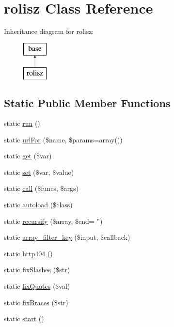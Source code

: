 \hypertarget{classrolisz}{
\section{rolisz Class Reference}
\label{classrolisz}
}
Inheritance diagram for rolisz:\begin{figure}[H]
\begin{center}
\leavevmode
\includegraphics[height=2.000000cm]{classrolisz}
\end{center}
\end{figure}
\subsection*{Static Public Member Functions}
\begin{DoxyCompactItemize}
\item 
static \hyperlink{classrolisz_ad3a572002fd350672b531756f7306e8f}{run} ()
\item 
static \hyperlink{classrolisz_a2c24b81993e81c6401edd6c4caff0336}{urlFor} (\$name, \$params=array())
\item 
static \hyperlink{classrolisz_a0e8f3e2708d9f0c6ee7b54599f57ea34}{get} (\$var)
\item 
static \hyperlink{classrolisz_a1d7c8d5e3d237bc3217650f79ab35bd3}{set} (\$var, \$value)
\item 
static \hyperlink{classrolisz_af732c33c326c863efe6dd2cccb21a9a5}{call} (\$funcs, \$args)
\item 
static \hyperlink{classrolisz_ab4c022bf9d3474583030f31894865182}{autoload} (\$class)
\item 
static \hyperlink{classrolisz_ad1b6efe27562cb6620a179f5688417bb}{recursify} (\$array, \$end= '')
\item 
static \hyperlink{classrolisz_a4e3140efc0d16bf5a55ee6c2f3c129e2}{array\_\-filter\_\-key} (\$input, \$callback)
\item 
static \hyperlink{classrolisz_a6fdc4c9fc517c619d860c7e91d17b02d}{http404} ()
\item 
static \hyperlink{classrolisz_a13d0c0500b75a5bdd849a4a55ba8e2b1}{fixSlashes} (\$str)
\item 
static \hyperlink{classrolisz_a031dd360aea86d999059dbfd18687973}{fixQuotes} (\$val)
\item 
static \hyperlink{classrolisz_ab8e0e9e5ffd59108f38efefe79511c5b}{fixBraces} (\$str)
\item 
static \hyperlink{classrolisz_a146085d0f3a9d17bdcd7f3d4081d8c0d}{start} ()
\end{DoxyCompactItemize}


